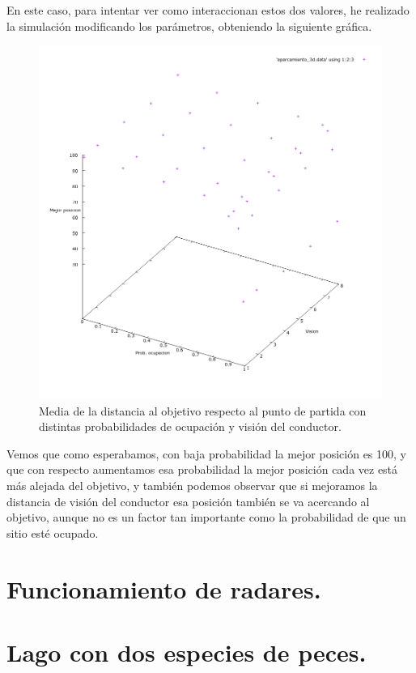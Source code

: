 \documentclass[12pt, spanish]{article}
\begin{document}
En este caso, para intentar ver como interaccionan estos dos valores, he realizado la simulación modificando los parámetros, obteniendo la siguiente gráfica.

\begin{figure}[H]
	\centering
	\includegraphics[scale = 0.6]{aparcamiento_3d.png}
	\caption{Media de la distancia al objetivo respecto al punto de partida con distintas probabilidades de ocupación y visión del conductor.}
	\label{fig:ej4}
\end{figure}

Vemos que como esperabamos, con baja probabilidad la mejor posición es 100, y que con respecto aumentamos esa probabilidad la mejor posición cada vez está más alejada del objetivo, y también podemos observar que si mejoramos la distancia de visión del conductor esa posición también se va acercando al objetivo, aunque no es un factor tan importante como la probabilidad de que un sitio esté ocupado.


\section{Funcionamiento de radares.}

\section{Lago con dos especies de peces.}

\newpage


\begin{thebibliography}{9}


\end{thebibliography}
\end{document}

